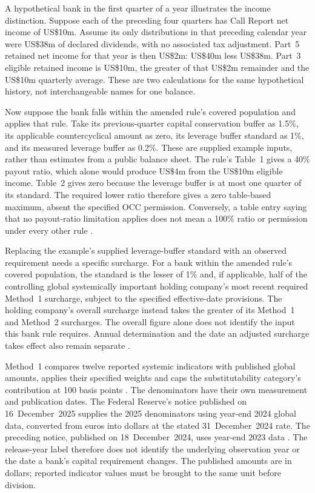 A hypothetical bank in the first quarter of a year illustrates the income
distinction. Suppose each of the preceding four quarters has Call Report net
income of US\$10m. Assume its only distributions in that preceding calendar
year were US\$38m of declared dividends, with no associated tax adjustment.
Part~5 retained net income for that year is then US\$2m: US\$40m less
US\$38m. Part~3 eligible retained income is US\$10m, the greater of that
US\$2m remainder and the US\$10m quarterly average. These are two calculations
for the same hypothetical history, not interchangeable names for one balance.

Now suppose the bank falls within the amended rule's covered population and
applies that rule. Take its previous-quarter capital conservation buffer as
1.5\%, its applicable countercyclical amount as zero, its leverage buffer
standard as 1\%, and its measured leverage buffer as 0.2\%. These are supplied
example inputs, rather than estimates from a public balance sheet. The rule's Table~1
gives a 40\% payout ratio, which alone would produce US\$4m from the
US\$10m eligible income. Table~2 gives zero because the leverage buffer is
at most one quarter of its standard. The required lower ratio therefore gives
a zero table-based maximum, absent the specified OCC permission. Conversely,
a table entry saying that no payout-ratio limitation applies does not mean a
100\% ratio or permission under every other rule
\citep[12~CFR~3.11(a)(4), (c), Tables~1--2]{occcapitalpayout2026}.


Replacing the example's supplied leverage-buffer standard with an observed
requirement needs a specific surcharge. For a bank within the amended rule's
covered population, the standard is the lesser of 1\% and, if applicable,
half of the controlling global systemically important holding company's most
recent required Method~1 surcharge, subject to the specified effective-date
provisions. The holding company's overall surcharge instead takes the greater
of its Method~1 and Method~2 surcharges. The overall figure alone does not
identify the input this bank rule requires.
Annual determination and the date an adjusted surcharge takes effect also
remain separate
\citep[12~CFR~3.11(a)(1)(v)]{occcapitalpayout2026}
\citep[12~CFR~217.403(a)--(d)]{fedgsibsurcharge2026}.

Method~1 compares twelve reported systemic indicators with published global
amounts, applies their specified weights and caps the substitutability
category's contribution at 100 basis points
\citep[12~CFR~217.404]{fedgsibscore2026}.
The denominators have their own measurement and publication dates. The
Federal Reserve's notice published on 16~December~2025 supplies the 2025
denominators using year-end 2024 global data, converted from euros into
dollars at the stated 31~December~2024 rate. The preceding notice, published
on 18~December~2024, uses year-end 2023 data
\citep[pp.~58245--58246]{fedgsibdenominators2025}
\citep[pp.~102908--102909]{fedgsibdenominators2024}.
The release-year label therefore does not identify the underlying observation
year or the date a bank's capital requirement changes. The published amounts
are in dollars; reported indicator values must be brought to the same unit
before division.

